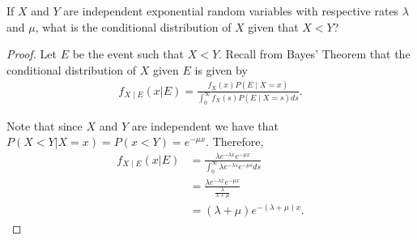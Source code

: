 \begin{problem}{5.8}
  If $X$ and $Y$ are independent exponential random variables with respective rates
  $\lambda$ and $\mu$, what is the conditional distribution of $X$ given that $X < Y$?
\end{problem}

\begin{proof}
  Let $E$ be the event such that $X < Y$. Recall from Bayes' Theorem that the conditional distribution
  of $X$ given $E$ is given by
  \begin{align*}
    f_{X\mid E}(x|E) = \frac{f_X(x)P(E \mid X=x)}{\int_0^\infty f_X(s)P(E\mid X=s) ds }.
  \end{align*}

  Note that since $X$ and $Y$ are independent we have that
  $P(X < Y | X = x) = P(x < Y) = e^{-\mu x}$. Therefore,
  \begin{align*}
    f_{X\mid E}(x|E) &= \frac{\lambda e^{-\lambda x} e^{-\mu x}}{\int_{0}^\infty \lambda e^{-\lambda s} e^{-\mu s} ds}\\
    &= \frac{\lambda e^{-\lambda x} e^{-\mu x}}{\frac{\lambda}{\lambda + \mu}} \\
    &= (\lambda + \mu) e^{-(\lambda + \mu)x}.
  \end{align*}

\end{proof}
\newpage
